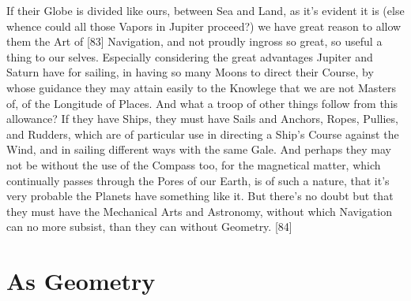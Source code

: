 \documentclass[letterpaper]{book}
\begin{document}
If their Globe is divided like ours, between Sea and Land, as it's evident it
is (else whence could all those Vapors in Jupiter proceed?) we have great
reason to allow them the Art of [83] Navigation, and not proudly ingross
so great, so useful a thing to our selves. Especially considering the great
advantages Jupiter and Saturn have for sailing, in having so many Moons
to direct their Course, by whose guidance they may attain easily to the
Knowlege that we are not Masters of, of the Longitude of Places. And what
a troop of other things follow from this allowance? If they have Ships, they
must have Sails and Anchors, Ropes, Pullies, and Rudders, which are of
particular use in directing a Ship's Course against the Wind, and in sailing
different ways with the same Gale. And perhaps they may not be without the
use of the Compass too, for the magnetical matter, which continually passes
through the Pores of our Earth, is of such a nature, that it's very probable
the Planets have something like it. But there's no doubt but that they must
have the Mechanical Arts and Astronomy, without which Navigation can no
more subsist, than they can without Geometry.
[84]


\section{As Geometry}
\end{document}
